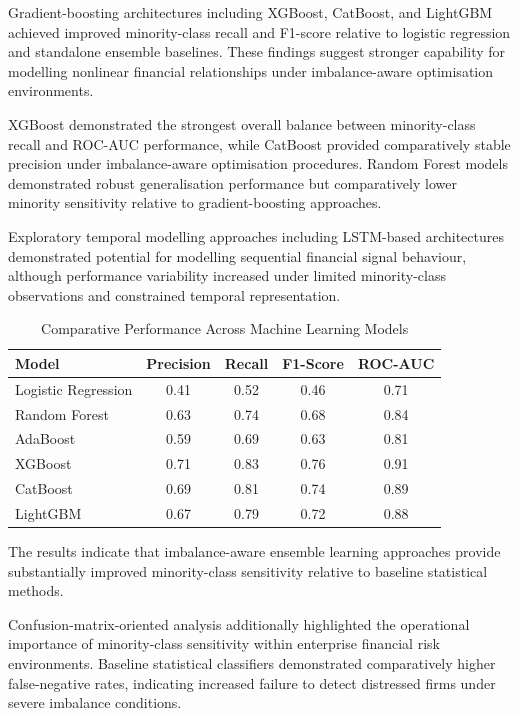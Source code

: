 \documentclass{article}
\begin{document}
Gradient-boosting architectures including XGBoost, CatBoost, and LightGBM achieved improved minority-class recall and F1-score relative to logistic regression and standalone ensemble baselines. These findings suggest stronger capability for modelling nonlinear financial relationships under imbalance-aware optimisation environments.

XGBoost demonstrated the strongest overall balance between minority-class recall and ROC-AUC performance, while CatBoost provided comparatively stable precision under imbalance-aware optimisation procedures. Random Forest models demonstrated robust generalisation performance but comparatively lower minority sensitivity relative to gradient-boosting approaches.

Exploratory temporal modelling approaches including LSTM-based architectures demonstrated potential for modelling sequential financial signal behaviour, although performance variability increased under limited minority-class observations and constrained temporal representation.

\begin{table}[h]
\centering
\caption{Comparative Performance Across Machine Learning Models}
\begin{tabular}{lcccc}
\toprule
Model & Precision & Recall & F1-Score & ROC-AUC \\
\midrule
Logistic Regression & 0.41 & 0.52 & 0.46 & 0.71 \\
Random Forest & 0.63 & 0.74 & 0.68 & 0.84 \\
AdaBoost & 0.59 & 0.69 & 0.63 & 0.81 \\
XGBoost & 0.71 & 0.83 & 0.76 & 0.91 \\
CatBoost & 0.69 & 0.81 & 0.74 & 0.89 \\
LightGBM & 0.67 & 0.79 & 0.72 & 0.88 \\
\bottomrule
\end{tabular}
\label{tab:model_results}
\end{table}

The results indicate that imbalance-aware ensemble learning approaches provide substantially improved minority-class sensitivity relative to baseline statistical methods.

Confusion-matrix-oriented analysis additionally highlighted the operational importance of minority-class sensitivity within enterprise financial risk environments. Baseline statistical classifiers demonstrated comparatively higher false-negative rates, indicating increased failure to detect distressed firms under severe imbalance conditions.
\end{document}
